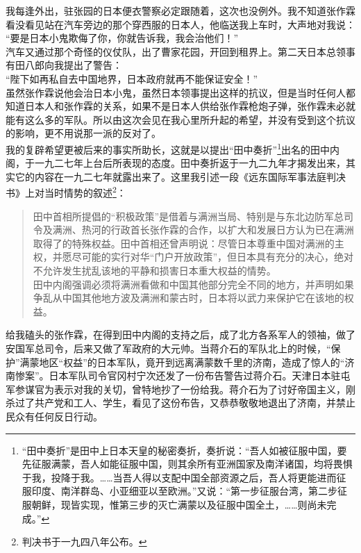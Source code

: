 我每逢外出，驻张园的日本便衣警察必定跟随着，这次也没例外。我不知道张作霖看没看见站在汽车旁边的那个穿西服的日本人，他临送我上车时，大声地对我说：\\

“要是日本小鬼欺侮了你，你就告诉我，我会治他们！”\\

汽车又通过那个奇怪的仪仗队，出了曹家花园，开回到租界上。第二天日本总领事有田八郎向我提出了警告：\\

“陛下如再私自去中国地界，日本政府就再不能保证安全！”\\

虽然张作霖说他会治日本小鬼，虽然日本领事提出这样的抗议，但是当时任何人都知道日本人和张作霖的关系，如果不是日本人供给张作霖枪炮子弹，张作霖未必就能有这么多的军队。所以由这次会见在我心里所升起的希望，并没有受到这个抗议的影响，更不用说那一派的反对了。\\

我的复辟希望更被后来的事实所助长，这就是以提出“田中奏折”\footnote{“田中奏折”是田中上日本天皇的秘密奏折，奏折说：“吾人如被征服中国，要先征服满蒙，吾人如能征服中国，则其余所有亚洲国家及南洋诸国，均将畏惧于我，投降于我。……当吾人得以支配中国全部资源之后，吾人将更能进而征服印度、南洋群岛、小亚细亚以至欧洲。”又说：“第一步征服台湾，第二步征服朝鲜，现皆实现，惟第三步的灭亡满蒙以及征服中国全土，……则尚未完成。”
}出名的田中内阁，于一九二七年上台后所表现的态度。田中奏折返于一九二九年才揭发出来，其实它的内容在一九二七年就露出来了。这里我引述一段《远东国际军事法庭判决书》上对当时情势的叙述\footnote{判决书于一九四八年公布。}：\\

\begin{quote}
	田中首相所提倡的“积极政策”是借着与满洲当局、特别是与东北边防军总司令及满洲、热河的行政首长张作霖的合作，以扩大和发展日方认为已在满洲取得了的特殊权益。田中首相还曾声明说：尽管日本尊重中国对满洲的主权，并愿尽可能的实行对华“门户开放政策”，但日本具有充分的决心，绝对不允许发生扰乱该地的平静和损害日本重大权益的情势。\\

田中内阁强调必须将满洲看做和中国其他部分完全不同的地方，并声明如果争乱从中国其他地方波及满洲和蒙古时，日本将以武力来保护它在该地的权益。\\
\end{quote}

给我磕头的张作霖，在得到田中内阁的支持之后，成了北方各系军人的领袖，做了安国军总司令，后来又做了军政府的大元帅。当蒋介石的军队北上的时候，“保护”满蒙地区“权益”的日本军队，竟开到远离满蒙数千里的济南，造成了惊人的“济南惨案”。日本军队司令官冈村宁次还发了一份布告警告过蒋介石。天津日本驻屯军参谋官为表示对我的关切，曾特地抄了一份给我。蒋介石为了讨好帝国主义，刚杀过了共产党和工人、学生，看见了这份布告，又恭恭敬敬地退出了济南，并禁止民众有任何反日行动。\\

